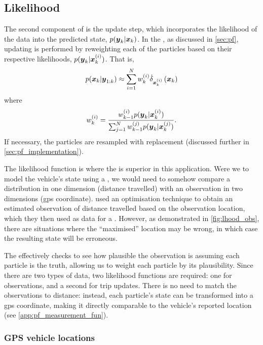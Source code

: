 \subsection{Likelihood}
\label{sec:pf-likelihood}

The second component of  is the update step, which incorporates the likelihood of the data into the predicted state, $p(\boldsymbol{y}_k | \boldsymbol x_k)$. In the \pf{}, as discussed in \cref{sec:pf}, updating is performed by reweighting each of the particles based on their respective likelihoods, $p(\boldsymbol{y}_k | \boldsymbol x^{(i)}_k)$. That is,
\begin{equation}
\label{eq:vehicle_pf_update}
p(\Vstate_k | \Vobs_{1:k}) \approx
\sum_{i=1}^\Np
    \Pwt_{k}
    \DiracMeasure{\Vstate\vi_k}{\Vstate_k}
\end{equation}
where
\begin{equation}
\label{eq:vehicle_pf_reweight}
\Pwt_k = \frac{
    \Pwt_{k-1} p(\Vobs_k | \Vstate\vi_k)
}{
    \sum_{j=1}^\Np \Pwt[j]_{k-1} p(\Vobs_k | \Vstate\vi[j]_k)
}.
\end{equation}
If necessary, the particles are resampled with replacement (discussed further in \cref{sec:pf_implementation}).


The likelihood function is where the \pf{} is superior in this application. Were we to model the vehicle's state using a \kf{}, we would need to somehow compare a distribution in one dimension (distance travelled) with an observation in two dimensions (\gls{gps} coordinate). \citet{Cathey_2003} used an optimisation technique to obtain an estimated observation of distance travelled based on the observation location, which they then used as data for a \kf{}. However, as demonstrated in \cref{fig:lhood_obs}, there are situations where the ``maximised'' location may be wrong, in which case the resulting state will be erroneous.


The \pf{} effectively checks to see how plausible the observation is assuming each particle is the truth, allowing us to weight each particle by its plausibility. Since there are two types of data, two likelihood functions are required: one for \GPS{} observations, and a second for trip updates. There is no need to match the observations to distance: instead, each particle's state can be transformed into a \gls{gps} coordinate, making it directly comparable to the vehicle's reported location (see \cref{app:pf_measurement_fun}).


\subsubsection{GPS vehicle locations}
\label{sec:lhood_gps}


